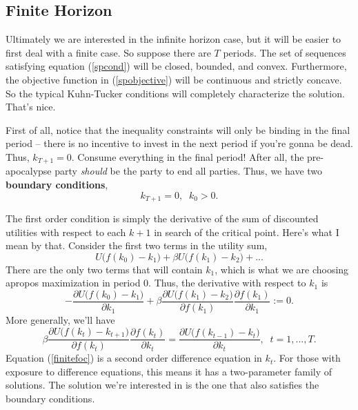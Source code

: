 \documentclass[12pt]{article}
\theoremstyle{definition}
\begin{document}
\subsection{Finite Horizon} 

Ultimately we are interested in the infinite horizon case, but it will be easier to first deal with a finite case. So suppose there are $T$ periods. 
The set of sequences satisfying equation (\ref{spcond}) will be closed, bounded, and convex. Furthermore, the objective function in (\ref{spobjective}) will be continuous and strictly concave. So the typical Kuhn-Tucker conditions will completely characterize the solution. That's nice. 

First of all, notice that the inequality constraints will only be binding in the final period -- there is no incentive to invest in the next period if you're gonna be dead. Thus, $k_{T+1}=0$. Consume everything in the final period! After all, the pre-apocalypse party \emph{should} be the party to end all parties. Thus, we have two \textbf{boundary conditions},
\begin{equation}
	k_{T+1}=0, \;\; k_0 >0.  \label{finitebc}
\end{equation}	
	
The first order condition is simply the derivative of the sum of discounted utilities with respect to each $k+1$ in search of the critical point. Here's what I mean by that. Consider the first two terms in the utility sum,
	\[U\big( f(k_0) - k_{1} \big)	 + \beta U\big( f(k_1) - k_{2} \big) + ... \]
There are the only two terms that will contain $k_1$, which is what we are choosing apropos maximization in period 0. Thus, the derivative with respect to $k_1$ is
	\[	
	-\frac{\partial U\big( f(k_0) - k_1 \big)}{\partial k_1} 	+ \beta \frac{\partial U\big( f(k_1) - k_2 \big)}{\partial f(k_1)} \frac{\partial f(k_1)}{\partial k_1} :=0.
	\]
More generally, we'll have 
\begin{equation}
	 \beta \frac{\partial U\big( f(k_t) - k_{t+1} \big)}{\partial f(k_t)} \frac{\partial f(k_t)}{\partial k_t} = \frac{\partial U\big( f(k_{t-1}) - k_t \big)}{\partial k_t} , \;\; t=1, ..., T. \label{finitefoc}
\end{equation}
Equation (\ref{finitefoc}) is a second order difference equation in $k_t$. For those with exposure to difference equations, this means it has a two-parameter family of solutions. The solution we're interested in is the one that also satisfies the boundary conditions. 
\end{document}
